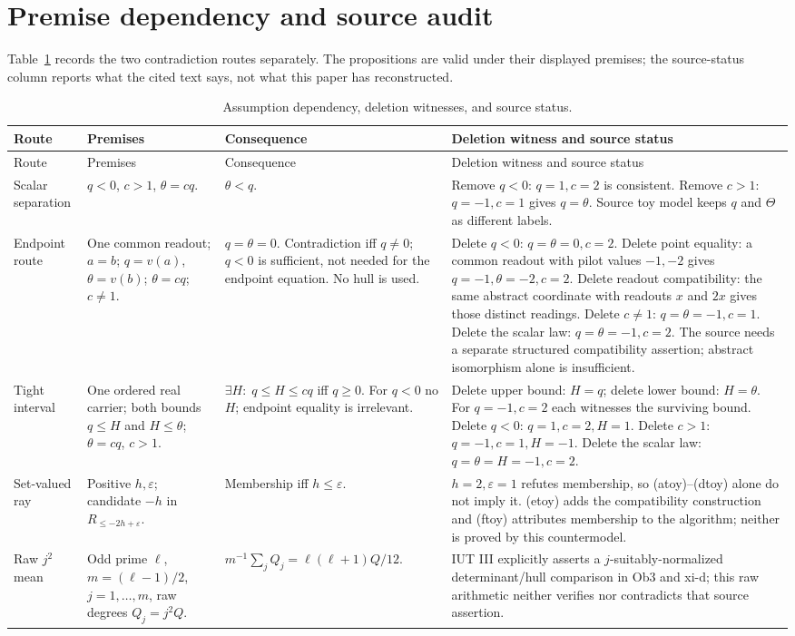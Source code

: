 \documentclass[11pt]{article}
\begin{document}
\section{Premise dependency and source audit}
Table~\ref{tab:dependencies} records the two contradiction routes separately. The propositions are valid under their displayed premises; the source-status column reports what the cited text says, not what this paper has reconstructed.
\begin{longtable}{p{}p{}p{}p{}}
\caption{Assumption dependency, deletion witnesses, and source status.}\label{tab:dependencies}\\
\toprule Route & Premises & Consequence & Deletion witness and source status\\\midrule
\endfirsthead
\toprule Route & Premises & Consequence & Deletion witness and source status\\\midrule
\endhead
Scalar separation & $q<0$, $c>1$, $\theta=cq$. & $\theta<q$. & Remove $q<0$: $q=1,c=2$ is consistent. Remove $c>1$: $q=-1,c=1$ gives $q=\theta$. Source toy model keeps $q$ and $\Theta$ as different labels.\\\addlinespace
Endpoint route & One common readout; $a=b$; $q=v(a)$, $\theta=v(b)$; $\theta=cq$; $c\ne1$. & $q=\theta=0$. Contradiction iff $q\ne0$; $q<0$ is sufficient, not needed for the endpoint equation. No hull is used. & Delete $q<0$: $q=\theta=0,c=2$. Delete point equality: a common readout with pilot values $-1,-2$ gives $q=-1,\theta=-2,c=2$. Delete readout compatibility: the same abstract coordinate with readouts $x$ and $2x$ gives those distinct readings. Delete $c\ne1$: $q=\theta=-1,c=1$. Delete the scalar law: $q=\theta=-1,c=2$. The source needs a separate structured compatibility assertion; abstract isomorphism alone is insufficient.\\\addlinespace
Tight interval & One ordered real carrier; both bounds $q\leq H$ and $H\leq\theta$; $\theta=cq$, $c>1$. & $\exists H:\;q\leq H\leq cq$ iff $q\geq0$. For $q<0$ no $H$; endpoint equality is irrelevant. & Delete upper bound: $H=q$; delete lower bound: $H=\theta$. For $q=-1,c=2$ each witnesses the surviving bound. Delete $q<0$: $q=1,c=2,H=1$. Delete $c>1$: $q=-1,c=1,H=-1$. Delete the scalar law: $q=\theta=H=-1,c=2$.\\\addlinespace
Set-valued ray & Positive $h,\varepsilon$; candidate $-h$ in $R_{\leq-2h+\varepsilon}$. & Membership iff $h\leq\varepsilon$. & $h=2,\varepsilon=1$ refutes membership, so (atoy)--(dtoy) alone do not imply it. (etoy) adds the compatibility construction and (ftoy) attributes membership to the algorithm; neither is proved by this countermodel.\\\addlinespace
Raw $j^2$ mean & Odd prime $\ell$, $m=(\ell-1)/2$, $j=1,\ldots,m$, raw degrees $Q_j=j^2Q$. & $m^{-1}\sum_jQ_j=\ell(\ell+1)Q/12$. & IUT III explicitly asserts a $j$-suitably-normalized determinant/hull comparison in Ob3 and xi-d; this raw arithmetic neither verifies nor contradicts that source assertion.\\
\bottomrule
\end{longtable}
\end{document}
